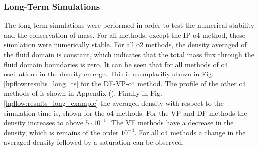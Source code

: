 \subsubsection{Long-Term Simulations}

The long-term simulations were performed in order to test the numerical-stability and the conservation of mass.
For all methods, except the IP-o4 method, these simulation were numerically stable.
For all o2 methods, the density averaged of the fluid domain is constant, which indicates that the total mass flux through the
fluid domain boundaries is zero.
It can be seen that for all methods of o4 oscillations in the density emerge.
This is exemplariliy shown in Fig.  \ref{hpflow:results_long_ts} for the DF-VP-o4 method.
The profile of the other o4 methods of is shown in Appendix ().
Finally in Fig. \ref{hpflow:results_long_example} the averaged density with respect to the simulation time is, shown for the
o4 methods.  For the VP and DF methods the density increases to above $5\cdot10^{-5}$.
The VF methods have a decrease in the density, which is remains of the order $10^{-4}$.
For all o4 methods a change in the averaged density followed by a saturation can be observed.


